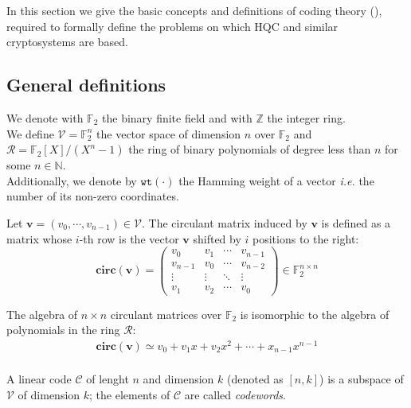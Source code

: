 In this section we give the basic concepts and definitions of coding theory (\cite{macwilliams1977theory}), required to formally define
the problems on which HQC and similar cryptosystems are based.

\subsection{General definitions}
We denote with $\mathds{F}_2$ the binary finite field and with $\mathds{Z}$ the integer ring.\\
We define $\mathcal{V} = \mathds{F}_2^n$ the vector space of dimension $n$ over $\mathds{F}_2$ 
and $\mathcal{R}=\mathds{F}_2[X]/(X^n-1)$ the ring of binary polynomials of degree less than $n$ for some $n \in \mathds{N}$.\\
Additionally, we denote by $\texttt{wt}(\cdot)$ the Hamming weight of a vector \textit{i.e.} the number of its non-zero coordinates.

\begin{definition}
    Let $\mathbf{v} = (v_0, \cdots, v_{n-1}) \in \mathcal{V}$. The circulant matrix induced by $\mathbf{v}$ is defined as
    a matrix whose $i$-th row is the vector $\mathbf{v}$ shifted by $i$ positions to the right:
    \begin{equation*}
        \mathbf{circ(v)} = \begin{pmatrix}
            v_0 & v_1 & \cdots & v_{n-1} \\
            v_{n-1} & v_0 & \cdots & v_{n-2} \\
            \vdots & \vdots & \ddots & \vdots \\
            v_1 & v_2 & \cdots & v_0
            \end{pmatrix} \in \mathds{F}_2^{n\times n}
    \end{equation*}
\end{definition}
The algebra of $n\times n$ circulant matrices over $\mathds{F}_2$ is isomorphic to the algebra of polynomials
in the ring $\mathcal{R}$:
\begin{align*}
    \mathbf{circ(v)} \simeq v_0 + v_1x + v_2x^2 + \cdots + x_{n-1}x^{n-1} \\
\end{align*}

\begin{definition}
    A linear code $\mathcal{C}$ of lenght $n$ and dimension $k$ (denoted as $[n, k]$) is a subspace of $\mathcal{V}$ 
    of dimension $k$; the elements of $\mathcal{C}$ are called \textit{codewords}.
\end{definition}


